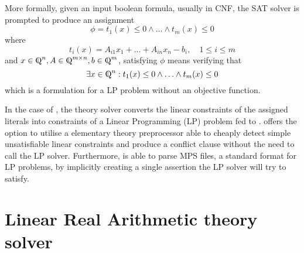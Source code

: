 \documentclass[runningheads]{llncs}
\begin{document}
More formally, given an input boolean formula, usually in CNF, the SAT solver is prompted to produce an assignment
\begin{equation} %
    \label{eq:smt-formula}
    \phi = t_1(x) \le 0 \wedge \ldots \wedge t_m (x) \le 0
\end{equation}
where
\begin{equation*}
    t_i(x) = A_{i1}x_1 + \ldots + A_{in}x_n - b_i, \quad 1 \le i \le m
\end{equation*}
and $x \in \bbbq^n, A \in \bbbq^{m \times n}, b \in \bbbq^m$, satisfying $\phi$ means verifying that
\begin{equation*}
    \exists x \in \bbbq^n : t_1(x) \le 0 \wedge \ldots \wedge t_m(x) \le 0
\end{equation*}
which is a formulation for a LP problem without an objective function.

In the case of \dlinear, the theory solver converts the linear constraints of the assigned literals into constraints of a Linear Programming (LP) problem fed to \soplex.
\dlinear offers the option to utilise a elementary theory preprocessor able to cheaply detect simple unsatisfiable linear constraints and produce a conflict clause without the need to call the LP solver.
Furthermore, \dlinear is able to parse MPS files, a standard format for LP problems, by implicitly creating a single assertion the LP solver will try to satisfy.

\section{Linear Real Arithmetic theory solver}
\end{document}
